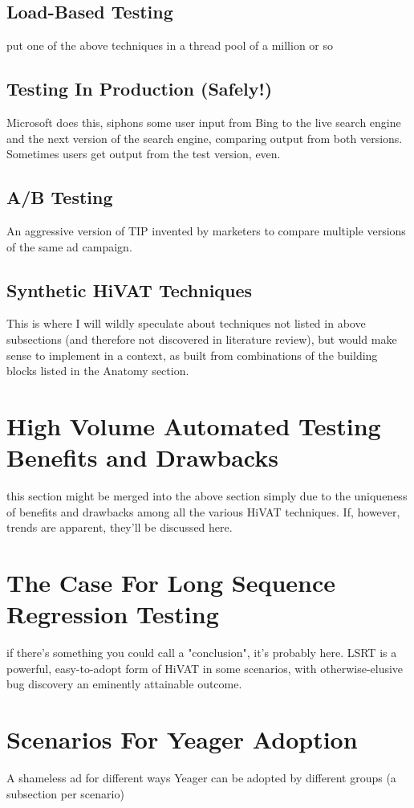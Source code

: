\subsection{Load-Based Testing}
put one of the above techniques in a thread pool of a million or so

\subsection{Testing In Production (Safely!)}
Microsoft does this, siphons some user input from Bing to the live search engine and the next version of the search engine, comparing output from both versions. Sometimes users get output from the test version, even.

\subsection{A/B Testing}
An aggressive version of TIP invented by marketers to compare multiple versions of the same ad campaign.

\subsection{Synthetic HiVAT Techniques}
This is where I will wildly speculate about techniques not listed in above subsections (and therefore not discovered in literature review), but would make sense to implement in a context, as built from combinations of the building blocks listed in the Anatomy section.

\section{High Volume Automated Testing Benefits and Drawbacks}
  this section might be merged into the above section simply due to the uniqueness of benefits and drawbacks among all the various HiVAT techniques. If, however, trends are apparent, they'll be discussed here.

\section{The Case For Long Sequence Regression Testing}
  if there's something you could call a "conclusion", it's probably here. LSRT is a powerful, easy-to-adopt form of HiVAT in some scenarios, with otherwise-elusive bug discovery an eminently attainable outcome.

\section{Scenarios For Yeager Adoption}
A shameless ad for different ways Yeager can be adopted by different groups (a subsection per scenario)
